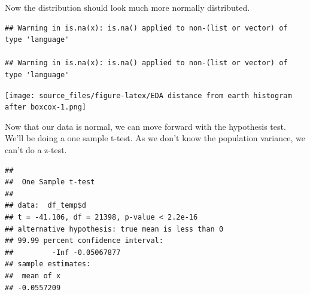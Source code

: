 \documentclass[
]{article}
\newenvironment{Shaded}{\begin{snugshade}}{\end{snugshade}}
\newcommand{\AttributeTok}[1]{\textcolor[rgb]{0.13,0.29,0.53}{#1}}
\newcommand{\DecValTok}[1]{\textcolor[rgb]{0.00,0.00,0.81}{#1}}
\newcommand{\FloatTok}[1]{\textcolor[rgb]{0.00,0.00,0.81}{#1}}
\newcommand{\FunctionTok}[1]{\textcolor[rgb]{0.13,0.29,0.53}{\textbf{#1}}}
\newcommand{\NormalTok}[1]{#1}
\newcommand{\OtherTok}[1]{\textcolor[rgb]{0.56,0.35,0.01}{#1}}
\newcommand{\SpecialCharTok}[1]{\textcolor[rgb]{0.81,0.36,0.00}{\textbf{#1}}}
\newcommand{\StringTok}[1]{\textcolor[rgb]{0.31,0.60,0.02}{#1}}
\begin{document}
\begin{Shaded}
\end{Shaded}

Now the distribution should look much more normally distributed.

\begin{verbatim}
## Warning in is.na(x): is.na() applied to non-(list or vector) of type 'language'

## Warning in is.na(x): is.na() applied to non-(list or vector) of type 'language'
\end{verbatim}

\texttt{[image: source\_files/figure-latex/EDA distance from earth histogram after boxcox-1.png]}

Now that our data is normal, we can move forward with the hypothesis
test. We'll be doing a one sample t-test. As we don't know the
population variance, we can't do a z-test.

\begin{Shaded}
\end{Shaded}

\begin{verbatim}
## 
##  One Sample t-test
## 
## data:  df_temp$d
## t = -41.106, df = 21398, p-value < 2.2e-16
## alternative hypothesis: true mean is less than 0
## 99.99 percent confidence interval:
##         -Inf -0.05067877
## sample estimates:
##  mean of x 
## -0.0557209
\end{verbatim}
\end{document}
